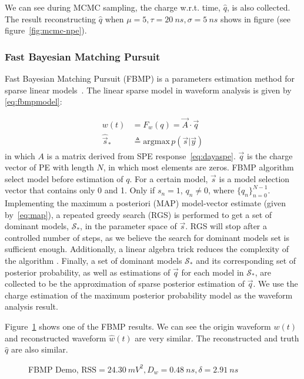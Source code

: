 We can see during MCMC sampling, the charge w.r.t. time, $\hat{q}$, is also collected. The result reconstructing $\hat{q}$ when $\mu=5, \tau=\SI{20}{ns}, \sigma=\SI{5}{ns}$ shows in figure (see figure~\ref{fig:mcmc-npe}). 

\subsubsection{Fast Bayesian Matching Pursuit}

Fast Bayesian Matching Pursuit (FBMP) is a parameters estimation method for sparse linear models~\cite{schniter_fast_nodate}. The linear sparse model in waveform analysis is given by \eqref{eq:fbmpmodel}: 

\begin{align}
    w(t) &= F_{w}(q) = \vec{A}\cdot \vec{q} \label{eq:fbmpmodel} \\
    \hat{\vec{s}}_{*} &\triangleq \mathrm{argmax}\,p(\vec{s}|\vec{y}) \label{eq:map}
\end{align}
in which $A$ is a matrix derived from SPE response~\eqref{eq:dayaspe}. $\vec{q}$ is the charge vector of PE with length $N$, in which most elements are zeros. FBMP algorithm select model before estimation of $q$. For a certain model, $\vec{s}$ is a model selection vector that contains only 0 and 1. Only if $s_{n}=1$, $q_{n}\neq0$, where $\{q_{n}\}_{n=0}^{N-1}$. Implementing the maximum a posteriori (MAP) model-vector estimate (given by~\eqref{eq:map}), a repeated greedy search (RGS) is performed to get a set of dominant models, $\mathcal{S}_{*}$, in the parameter space of $\vec{s}$. RGS will stop after a controlled number of steps, as we believe the search for dominant models set is sufficient enough. Additionally, a linear algebra trick reduces the complexity of the algorithm \cite{schniter_fast_nodate}. Finally, a set of dominant models $\mathcal{S}_{*}$ and its corresponding set of posterior probability, as well as estimations of $\vec{q}$ for each model in $\mathcal{S}_{*}$, are collected to be the approximation of sparse posterior estimation of $\vec{q}$. We use the charge estimation of the maximum posterior probability model as the waveform analysis result. 

Figure~\ref{fig:fbmp} shows one of the FBMP results. We can see the origin waveform $w(t)$ and reconstructed waveform $\hat{w}(t)$ are very similar. The reconstructed and truth $\hat{q}$ are also similar. 

\begin{figure}[H]
    \centering
    \scalebox{0.4}{}
    \caption{\label{fig:fbmp} FBMP Demo, $\mathrm{RSS}=\SI{24.30}{mV^2},D_w=\SI{0.48}{ns},\delta=\SI{2.91}{ns}$}
\end{figure}

